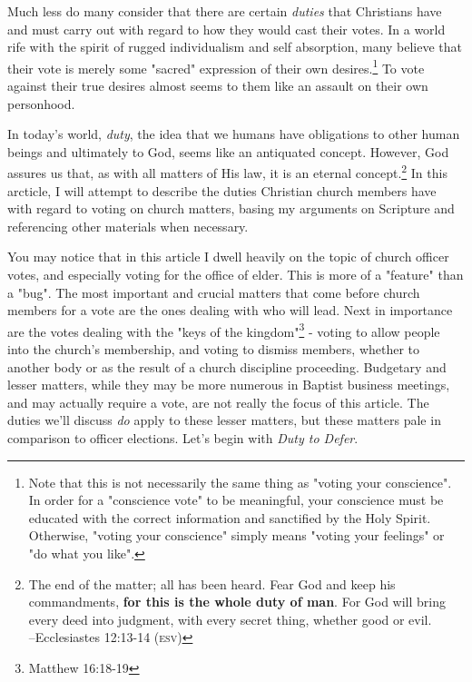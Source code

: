 Much less do many consider that there are certain \textit{duties} that Christians have and must carry out with regard to how they would cast their votes.  In a world rife with the spirit of rugged individualism and self absorption, many believe that their vote is merely some "sacred" expression of their own desires.\footnote{Note that this is not necessarily the same thing as "voting your conscience".  In order for a "conscience vote" to be meaningful, your conscience must be educated with the correct information and sanctified by the Holy Spirit.  Otherwise, "voting your conscience" simply means "voting your feelings" or "do what you like".}  To vote against their true desires almost seems to them like an assault on their own personhood.

In today's world, \textit{duty}, the idea that we humans have obligations to other human beings and ultimately to God, seems like an antiquated concept.  However, God assures us that, as with all matters of His law, it is an eternal concept.\footnote{The end of the matter; all has been heard. Fear God and keep his commandments, \textbf{for this is the whole duty of man}. For God will bring every deed into judgment, with every secret thing, whether good or evil. \\ \hspace*{\fill} --Ecclesiastes 12:13-14 (\textsc{esv})} In this arcticle, I will attempt to describe the duties Christian church members have with regard to voting on church matters, basing my arguments on Scripture and referencing other materials when necessary.

You may notice that in this article I dwell heavily on the topic of church officer votes, and especially voting for the office of elder.  This is more of a "feature" than a "bug".  The most important and crucial matters that come before church members for a vote are the ones dealing with who will lead.  Next in importance are the votes dealing with the "keys of the kingdom"\footnote{Matthew 16:18-19} - voting to allow people into the church's membership, and voting to dismiss members, whether to another body or as the result of a church discipline proceeding.  Budgetary and lesser matters, while they may be more numerous in Baptist business meetings, and may actually require a vote, are not really the focus of this article.  The duties we'll discuss \textit{do} apply to these lesser matters, but these matters pale in comparison to officer elections.  Let's begin with \textit{Duty to Defer}.

\ifdefined\embedversion\newpage\fi
